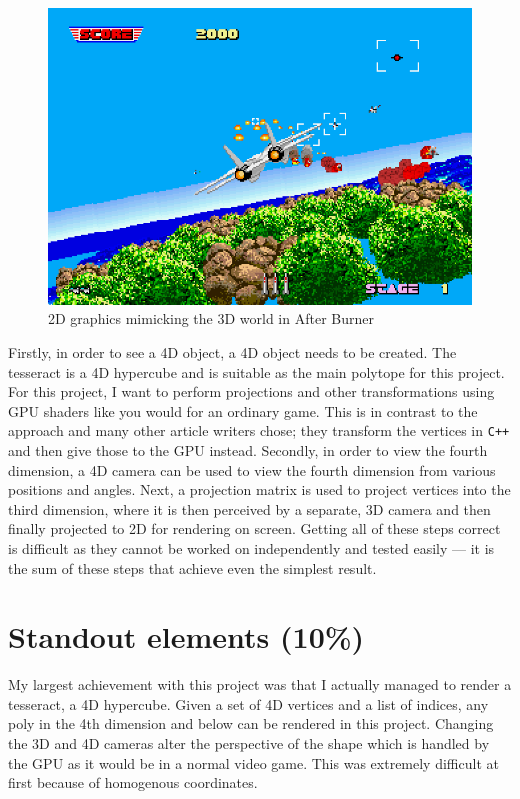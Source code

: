 \documentclass[11pt, a4paper]{article}
\begin{document}
\begin{figure}[!h]
  \centering
  \includegraphics[width=12cm]{img/after_burner.png}
  \caption{2D graphics mimicking the 3D world in After Burner \parencite{awesome2016arcade}}
  \label{fig:afterburner}
\end{figure}

Firstly, in order to see a 4D object, a 4D object needs to be created. The tesseract is a 4D hypercube and is suitable as the main polytope for this project. For this project, I want to perform projections and other transformations using GPU shaders like you would for an ordinary game. This is in contrast to the approach \citeauthor*{hollasch1991four} \parencite*{hollasch1991four} and many other article writers chose; they transform the vertices in \texttt{C++} and then give those to the GPU instead. Secondly, in order to view the fourth dimension, a 4D camera can be used to view the fourth dimension from various positions and angles. Next, a projection matrix is used to project vertices into the third dimension, where it is then perceived by a separate, 3D camera and then finally projected to 2D for rendering on screen. Getting all of these steps correct is difficult as they cannot be worked on independently and tested easily --- it is the sum of these steps that achieve even the simplest result. 

\section{Standout elements (10\%)}
\label{sec:standoutElements}

My largest achievement with this project was that I actually managed to render a tesseract, a 4D hypercube. Given a set of 4D vertices and a list of indices, any poly in the 4th dimension and below can be rendered in this project. Changing the 3D and 4D cameras alter the perspective of the shape which is handled by the GPU as it would be in a normal video game. This was extremely difficult at first because of homogenous coordinates.
\end{document}
